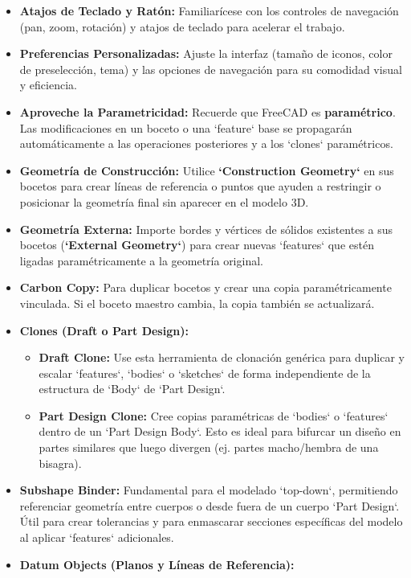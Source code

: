 \documentclass[12pt]{article}
\begin{document}
\begin{itemize}[label=\textbullet]
    \item \textbf{Atajos de Teclado y Ratón:} Familiarícese con los controles de navegación (pan, zoom, rotación) y atajos de teclado para acelerar el trabajo.
    \item \textbf{Preferencias Personalizadas:} Ajuste la interfaz (tamaño de iconos, color de preselección, tema) y las opciones de navegación para su comodidad visual y eficiencia.
    \item \textbf{Aproveche la Parametricidad:} Recuerde que FreeCAD es \textbf{paramétrico}. Las modificaciones en un boceto o una `feature` base se propagarán automáticamente a las operaciones posteriores y a los `clones` paramétricos.
    \item \textbf{Geometría de Construcción:} Utilice \textbf{`Construction Geometry`} en sus bocetos para crear líneas de referencia o puntos que ayuden a restringir o posicionar la geometría final sin aparecer en el modelo 3D.
    \item \textbf{Geometría Externa:} Importe bordes y vértices de sólidos existentes a sus bocetos (\textbf{`External Geometry`}) para crear nuevas `features` que estén ligadas paramétricamente a la geometría original.
    \item \textbf{Carbon Copy:} Para duplicar bocetos y crear una copia paramétricamente vinculada. Si el boceto maestro cambia, la copia también se actualizará.
    \item \textbf{Clones (Draft o Part Design):}
    \begin{itemize}[label=\textendash]
        \item \textbf{Draft Clone:} Use esta herramienta de clonación genérica para duplicar y escalar `features`, `bodies` o `sketches` de forma independiente de la estructura de `Body` de `Part Design`.
        \item \textbf{Part Design Clone:} Cree copias paramétricas de `bodies` o `features` dentro de un `Part Design Body`. Esto es ideal para bifurcar un diseño en partes similares que luego divergen (ej. partes macho/hembra de una bisagra).
    \end{itemize}
    \item \textbf{Subshape Binder:} Fundamental para el modelado `top-down`, permitiendo referenciar geometría entre cuerpos o desde fuera de un cuerpo `Part Design`. Útil para crear tolerancias y para enmascarar secciones específicas del modelo al aplicar `features` adicionales.
    \item \textbf{Datum Objects (Planos y Líneas de Referencia):}

\end{itemize}
\end{document}
